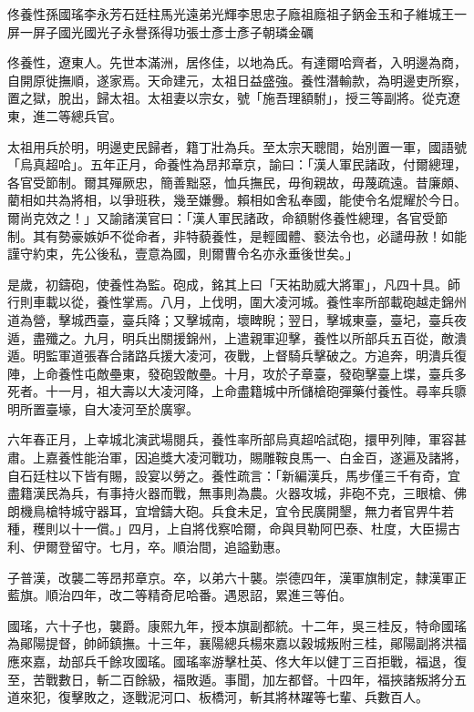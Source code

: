 
\begin{pinyinscope}
佟養性孫國瑤李永芳石廷柱馬光遠弟光輝李思忠子廕祖廕祖子鈵金玉和子維城王一屏一屏子國光國光子永譽孫得功張士彥士彥子朝璘金礪

佟養性，遼東人。先世本滿洲，居佟佳，以地為氏。有達爾哈齊者，入明邊為商，自開原徙撫順，遂家焉。天命建元，太祖日益盛強。養性潛輸款，為明邊吏所察，置之獄，脫出，歸太祖。太祖妻以宗女，號「施吾理額駙」，授三等副將。從克遼東，進二等總兵官。

太祖用兵於明，明邊吏民歸者，籍丁壯為兵。至太宗天聰間，始別置一軍，國語號「烏真超哈」。五年正月，命養性為昂邦章京，諭曰：「漢人軍民諸政，付爾總理，各官受節制。爾其殫厥忠，簡善黜惡，恤兵撫民，毋徇親故，毋蔑疏遠。昔廉頗、藺相如共為將相，以爭班秩，幾至嫌釁。賴相如舍私奉國，能使令名焜耀於今日。爾尚克效之！」又諭諸漢官曰：「漢人軍民諸政，命額駙佟養性總理，各官受節制。其有勢豪嫉妒不從命者，非特藐養性，是輕國體、褻法令也，必譴毋赦！如能謹守約束，先公後私，壹意為國，則爾曹令名亦永垂後世矣。」

是歲，初鑄砲，使養性為監。砲成，銘其上曰「天祐助威大將軍」，凡四十具。師行則車載以從，養性掌焉。八月，上伐明，圍大凌河城。養性率所部載砲越走錦州道為營，擊城西臺，臺兵降；又擊城南，壞睥睨；翌日，擊城東臺，臺圮，臺兵夜遁，盡殲之。九月，明兵出關援錦州，上遣親軍迎擊，養性以所部兵五百從，敵潰遁。明監軍道張春合諸路兵援大凌河，夜戰，上督騎兵擊破之。方追奔，明潰兵復陣，上命養性屯敵壘東，發砲毀敵壘。十月，攻於子章臺，發砲擊臺上堞，臺兵多死者。十一月，祖大壽以大凌河降，上命盡籍城中所儲槍砲彈藥付養性。尋率兵隳明所置臺壕，自大凌河至於廣寧。

六年春正月，上幸城北演武場閱兵，養性率所部烏真超哈試砲，擐甲列陣，軍容甚肅。上嘉養性能治軍，因追獎大凌河戰功，賜雕鞍良馬一、白金百，遂遍及諸將，自石廷柱以下皆有賜，設宴以勞之。養性疏言：「新編漢兵，馬步僅三千有奇，宜盡籍漢民為兵，有事持火器而戰，無事則為農。火器攻城，非砲不克，三眼槍、佛朗機鳥槍特城守器耳，宜增鑄大砲。兵食未足，宜令民廣開墾，無力者官畀牛若種，穫則以十一償。」四月，上自將伐察哈爾，命與貝勒阿巴泰、杜度，大臣揚古利、伊爾登留守。七月，卒。順治間，追謚勤惠。

子普漢，改襲二等昂邦章京。卒，以弟六十襲。崇德四年，漢軍旗制定，隸漢軍正藍旗。順治四年，改二等精奇尼哈番。遇恩詔，累進三等伯。

國瑤，六十子也，襲爵。康熙九年，授本旗副都統。十二年，吳三桂反，特命國瑤為鄖陽提督，帥師鎮撫。十三年，襄陽總兵楊來嘉以穀城叛附三桂，鄖陽副將洪福應來嘉，劫部兵千餘攻國瑤。國瑤率游擊杜英、佟大年以健丁三百拒戰，福退，復至，苦戰數日，斬二百餘級，福敗遁。事聞，加左都督。十四年，福挾諸叛將分五道來犯，復擊敗之，逐戰泥河口、板橋河，斬其將林躍等七輩、兵數百人。


\end{pinyinscope}
